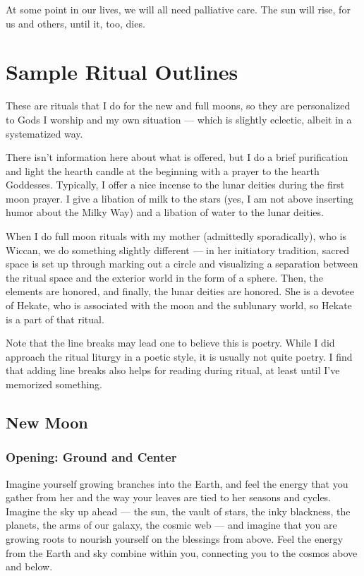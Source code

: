 \documentclass[
]{book}
\begin{document}
At some point in our lives, we will all need palliative care. The sun will rise, for us and others, until it, too, dies.

\hypertarget{sample-ritual-outlines}{%
\section{Sample Ritual Outlines}\label{sample-ritual-outlines}}

These are rituals that I do for the new and full moons, so they are personalized to Gods I worship and my own situation --- which is slightly eclectic, albeit in a systematized way.

There isn't information here about what is offered, but I do a brief purification and light the hearth candle at the beginning with a prayer to the hearth Goddesses. Typically, I offer a nice incense to the lunar deities during the first moon prayer. I give a libation of milk to the stars (yes, I am not above inserting humor about the Milky Way) and a libation of water to the lunar deities.

When I do full moon rituals with my mother (admittedly sporadically), who is Wiccan, we do something slightly different --- in her initiatory tradition, sacred space is set up through marking out a circle and visualizing a separation between the ritual space and the exterior world in the form of a sphere. Then, the elements are honored, and finally, the lunar deities are honored. She is a devotee of Hekate, who is associated with the moon and the sublunary world, so Hekate is a part of that ritual.

Note that the line breaks may lead one to believe this is poetry. While I did approach the ritual liturgy in a poetic style, it is usually not quite poetry. I find that adding line breaks also helps for reading during ritual, at least until I've memorized something.

\hypertarget{new-moon}{%
\subsection{New Moon}\label{new-moon}}

\hypertarget{opening-ground-and-center}{%
\subsubsection{Opening: Ground and Center}\label{opening-ground-and-center}}

Imagine yourself growing branches into the Earth, and feel the energy that you gather from her and the way your leaves are tied to her seasons and cycles. Imagine the sky up ahead --- the sun, the vault of stars, the inky blackness, the planets, the arms of our galaxy, the cosmic web --- and imagine that you are growing roots to nourish yourself on the blessings from above. Feel the energy from the Earth and sky combine within you, connecting you to the cosmos above and below.
\end{document}
